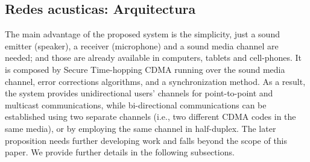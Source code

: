 \subsection{Redes acusticas: Arquitectura}
The main advantage of the proposed system is the simplicity, just a sound emitter (speaker), a receiver (microphone) and a sound media channel are needed; and those are already available in computers, tablets and cell-phones. It is composed by Secure Time-hopping CDMA running over the sound media channel, error corrections algorithms, and a synchronization method. As a result, the system provides unidirectional users’ channels for point-to-point and multicast communications, while bi-directional communications can be established using two separate channels (i.e., two different CDMA codes in the same media), or by employing the same channel in half-duplex. The later proposition needs further developing work and falls beyond the scope of this paper.
We provide further details in the following subsections.

